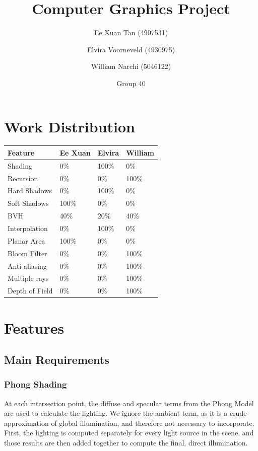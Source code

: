 \documentclass{article}
\author{Ee Xuan Tan (4907531) \and Elvira Voorneveld (4930975) \and William Narchi (5046122)}
\date{Group 40}
\title{Computer Graphics Project}
\begin{document}
    \maketitle

    \section{Work Distribution}
    \begin{tabular}{ |p{2.5cm}||p{2.5cm}|p{2.5cm}|p{2.5cm}| }
        \hline
        \textbf{Feature} &\textbf{Ee Xuan} &\textbf{Elvira} &\textbf{William}\\
        \hline
        Shading                        &0\%    &100\%  &0\%\\
        Recursion                      &0\%    &0\%    &100\%\\
        Hard Shadows                   &0\%    &100\%  &0\%\\
        Soft Shadows                   &100\%  &0\%    &0\%\\
        BVH                            &40\%   &20\%   &40\%\\
        Interpolation                  &0\%    &100\%  &0\%\\
        Planar Area                    &100\%  &0\%    &0\%\\
        Bloom Filter                   &0\%    &0\%    &100\%\\
        Anti-aliasing                  &0\%    &0\%    &100\%\\
        Multiple rays                  &0\%    &0\%    &100\%\\
        Depth of Field                 &0\%    &0\%    &100\%\\
        \hline
    \end{tabular}

    \newpage

    \section{Features}
    \subsection{Main Requirements}
    \subsubsection{Phong Shading}
    At each intersection point, the diffuse and specular terms from the Phong Model are used to calculate the 
    lighting. We ignore the ambient term, as it is a crude approximation of global illumination, and therefore 
    not necessary to incorporate. First, the lighting is computed separately for every light source in the 
    scene, and those results are then added together to compute the final, direct illumination.
\end{document}
